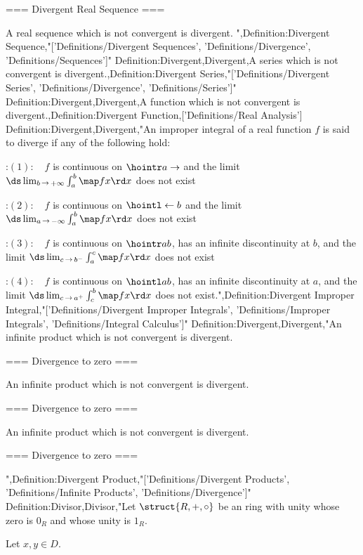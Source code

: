 === Divergent Real Sequence ===

A real sequence which is not convergent is divergent.
",Definition:Divergent Sequence,"['Definitions/Divergent Sequences', 'Definitions/Divergence', 'Definitions/Sequences']"
Definition:Divergent,Divergent,A series which is not convergent is divergent.,Definition:Divergent Series,"['Definitions/Divergent Series', 'Definitions/Divergence', 'Definitions/Series']"
Definition:Divergent,Divergent,A function which is not convergent is divergent.,Definition:Divergent Function,['Definitions/Real Analysis']
Definition:Divergent,Divergent,"An improper integral of a real function $f$ is said to diverge if any of the following hold:

:$(1): \quad f$ is continuous on $\hointr a \to$ and the limit $\ds \lim_{b \mathop \to +\infty} \int_a^b \map f x \rd x$ does not exist

:$(2): \quad f$ is continuous on $\hointl \gets b$ and the limit $\ds \lim_{a \mathop \to -\infty} \int_a^b \map f x \rd x$ does not exist

:$(3): \quad f$ is continuous on $\hointr a b$, has an infinite discontinuity at $b$, and the limit $\ds \lim_{c \mathop \to b^-} \int_a^c \map f x \rd x$ does not exist

:$(4): \quad f$ is continuous on $\hointl a b$, has an infinite discontinuity at $a$, and the limit $\ds \lim_{c \mathop \to a^+} \int_c^b \map f x \rd x$ does not exist.",Definition:Divergent Improper Integral,"['Definitions/Divergent Improper Integrals', 'Definitions/Improper Integrals', 'Definitions/Integral Calculus']"
Definition:Divergent,Divergent,"An infinite product which is not convergent is divergent.




=== Divergence to zero ===

An infinite product which is not convergent is divergent.




=== Divergence to zero ===

An infinite product which is not convergent is divergent.




=== Divergence to zero ===

",Definition:Divergent Product,"['Definitions/Divergent Products', 'Definitions/Infinite Products', 'Definitions/Divergence']"
Definition:Divisor,Divisor,"Let $\struct {R, +, \circ}$ be an ring with unity whose zero is $0_R$ and whose unity is $1_R$.

Let $x, y \in D$.

